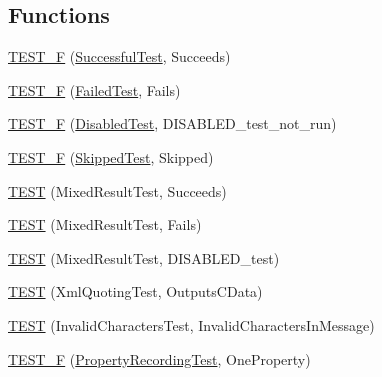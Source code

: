 \subsection*{Functions}
\begin{DoxyCompactItemize}
\item 
\mbox{\hyperlink{googletest-master_2googletest_2test_2gtest__xml__output__unittest___8cc_aa6dc865a2584304f44da9f4b085f8e08}{T\+E\+S\+T\+\_\+F}} (\mbox{\hyperlink{class_successful_test}{Successful\+Test}}, Succeeds)
\item 
\mbox{\hyperlink{googletest-master_2googletest_2test_2gtest__xml__output__unittest___8cc_a0789e983f69fddd50cd6a2ad73a167c2}{T\+E\+S\+T\+\_\+F}} (\mbox{\hyperlink{class_failed_test}{Failed\+Test}}, Fails)
\item 
\mbox{\hyperlink{googletest-master_2googletest_2test_2gtest__xml__output__unittest___8cc_a743749af716f6da79472d5a662e31723}{T\+E\+S\+T\+\_\+F}} (\mbox{\hyperlink{class_disabled_test}{Disabled\+Test}}, D\+I\+S\+A\+B\+L\+E\+D\+\_\+test\+\_\+not\+\_\+run)
\item 
\mbox{\hyperlink{googletest-master_2googletest_2test_2gtest__xml__output__unittest___8cc_a811b400874cfe6e10b4cfa3d0ef30fab}{T\+E\+S\+T\+\_\+F}} (\mbox{\hyperlink{class_skipped_test}{Skipped\+Test}}, Skipped)
\item 
\mbox{\hyperlink{googletest-master_2googletest_2test_2gtest__xml__output__unittest___8cc_a32b81caf894a39956292191e0ac9efe8}{T\+E\+ST}} (Mixed\+Result\+Test, Succeeds)
\item 
\mbox{\hyperlink{googletest-master_2googletest_2test_2gtest__xml__output__unittest___8cc_adb093d371e5672f26e82d2df1e66e311}{T\+E\+ST}} (Mixed\+Result\+Test, Fails)
\item 
\mbox{\hyperlink{googletest-master_2googletest_2test_2gtest__xml__output__unittest___8cc_a34e71da1ce98b2984594c8db97018c75}{T\+E\+ST}} (Mixed\+Result\+Test, D\+I\+S\+A\+B\+L\+E\+D\+\_\+test)
\item 
\mbox{\hyperlink{googletest-master_2googletest_2test_2gtest__xml__output__unittest___8cc_a6ac53dbcf6b02f01cc4f2486db8dd9dc}{T\+E\+ST}} (Xml\+Quoting\+Test, Outputs\+C\+Data)
\item 
\mbox{\hyperlink{googletest-master_2googletest_2test_2gtest__xml__output__unittest___8cc_aa07f760144874b77158b9336bdc95c93}{T\+E\+ST}} (Invalid\+Characters\+Test, Invalid\+Characters\+In\+Message)
\item 
\mbox{\hyperlink{googletest-master_2googletest_2test_2gtest__xml__output__unittest___8cc_af81998ca9ca595e3107c142ebd25e0d5}{T\+E\+S\+T\+\_\+F}} (\mbox{\hyperlink{class_property_recording_test}{Property\+Recording\+Test}}, One\+Property)

\end{DoxyCompactItemize}
